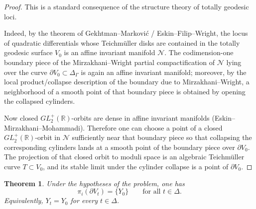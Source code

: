 \documentclass[11pt]{article}
\newtheorem{theorem}{Theorem}
\begin{document}
\begin{proof}
This is a standard consequence of the structure theory of totally geodesic loci.

Indeed, by the theorem of Gekhtman--Markovi\'c / Eskin--Filip--Wright, the locus of
quadratic differentials whose Teichm\"uller disks are contained in the totally geodesic
surface $V_0$ is an affine invariant manifold $\mathcal N$.  The codimension-one
boundary piece of the Mirzakhani--Wright partial compactification of $\mathcal N$
lying over the curve $\partial V_0\subset \Delta_\Gamma$ is again an affine invariant
manifold; moreover, by the local product/collapse description of the boundary due to
Mirzakhani--Wright, a neighborhood of a smooth point of that boundary piece is obtained
by opening the collapsed cylinders.

Now closed $GL_2^+(\mathbb R)$-orbits are dense in affine invariant manifolds
(Eskin--Mirzakhani--Mohammadi).  Therefore one can choose a point of a closed
$GL_2^+(\mathbb R)$-orbit in $\mathcal N$ sufficiently near that boundary piece so that
collapsing the corresponding cylinders lands at a smooth point of the boundary piece
over $\partial V_0$.  The projection of that closed orbit to moduli space is an
algebraic Teichm\"uller curve $T\subset V_0$, and its stable limit under the cylinder
collapse is a point of $\partial V_0$.
\end{proof}

\begin{theorem}
Under the hypotheses of the problem, one has
\[
\pi_i(\partial V_t)=\{Y_0\}\qquad\text{for all }t\in \Delta.
\]
Equivalently, $Y_t=Y_0$ for every $t\in\Delta$.
\end{theorem}
\end{document}
